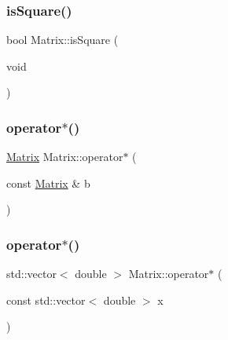 \mbox{\label{class_matrix_ae67c274d2425c1323a3a3356c174d071}} 
\subsubsection{\texorpdfstring{is\+Square()}{isSquare()}}
{\footnotesize\ttfamily bool Matrix\+::is\+Square (\begin{DoxyParamCaption}\item[{void}]{ }\end{DoxyParamCaption})\hspace{0.3cm}{\ttfamily [inline]}}

\mbox{\label{class_matrix_ac17891c37c77aabb69f2b82e15befb4d}} 
\subsubsection{\texorpdfstring{operator$\ast$()}{operator*()}\hspace{0.1cm}{\footnotesize\ttfamily [1/2]}}
{\footnotesize\ttfamily \mbox{\hyperlink{class_matrix}{Matrix}} Matrix\+::operator$\ast$ (\begin{DoxyParamCaption}\item[{const \mbox{\hyperlink{class_matrix}{Matrix}} \&}]{b }\end{DoxyParamCaption})}

\mbox{\label{class_matrix_a049af5ca6904481796a79f94d8cbef31}} 
\subsubsection{\texorpdfstring{operator$\ast$()}{operator*()}\hspace{0.1cm}{\footnotesize\ttfamily [2/2]}}
{\footnotesize\ttfamily std\+::vector$<$ double $>$ Matrix\+::operator$\ast$ (\begin{DoxyParamCaption}\item[{const std\+::vector$<$ double $>$}]{x }\end{DoxyParamCaption})}

\mbox{\label{class_matrix_ab5df6e16d56f931d712dc3b739f3e56d}} 
